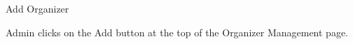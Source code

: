 
\begin{uc}{Add Organizer}


    \begin{uc-trig}
        Admin clicks on the Add button at the top of the Organizer Management
        page.
    \end{uc-trig}

\end{uc}

